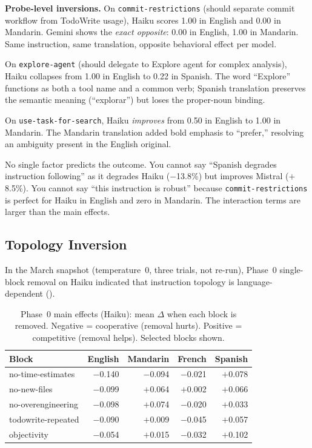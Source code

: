 \documentclass[11pt,a4paper]{article}
\begin{document}
\textbf{Probe-level inversions.} On \texttt{commit-restrictions}
(should separate commit workflow from TodoWrite usage), Haiku scores
1.00 in English and 0.00 in Mandarin. Gemini shows the \emph{exact
opposite}: 0.00 in English, 1.00 in Mandarin. Same instruction, same
translation, opposite behavioral effect per model.

On \texttt{explore-agent} (should delegate to Explore agent for
complex analysis), Haiku collapses from 1.00 in English to 0.22 in
Spanish. The word ``Explore'' functions as both a tool name and a
common verb; Spanish translation preserves the semantic meaning
(``explorar'') but loses the proper-noun binding.

On \texttt{use-task-for-search}, Haiku \emph{improves} from 0.50 in
English to 1.00 in Mandarin. The Mandarin translation added bold
emphasis to ``prefer,'' resolving an ambiguity present in the
English original.

No single factor predicts the outcome. You cannot say ``Spanish
degrades instruction following'' as it degrades Haiku ($-$13.8\%) but
improves Mistral ($+$8.5\%). You cannot say ``this instruction is
robust'' because \texttt{commit-restrictions} is perfect for Haiku in
English and zero in Mandarin. The interaction terms are larger than
the main effects.

\subsection{Topology Inversion}
\label{sec:topology}

In the March snapshot (temperature~0, three trials, not re-run),
Phase~0 single-block removal on Haiku indicated that instruction
topology is language-dependent ().

\begin{table}[ht]
\centering
\caption{Phase~0 main effects (Haiku): mean $\Delta$ when each block
is removed. Negative = cooperative (removal hurts). Positive =
competitive (removal helps). Selected blocks shown.}
\label{tab:phase0}
\begin{tabular}{lrrrr}
\toprule
Block & English & Mandarin & French & Spanish \\
\midrule
no-time-estimates & $-$0.140 & $-$0.094 & $-$0.021 & $+$0.078 \\
no-new-files      & $-$0.099 & $+$0.064 & $+$0.002 & $+$0.066 \\
no-overengineering & $-$0.098 & $+$0.074 & $-$0.020 & $+$0.033 \\
todowrite-repeated & $-$0.090 & $+$0.009 & $-$0.045 & $+$0.057 \\
objectivity       & $-$0.054 & $+$0.015 & $-$0.032 & $+$0.102 \\
\bottomrule
\end{tabular}
\end{table}
\end{document}
